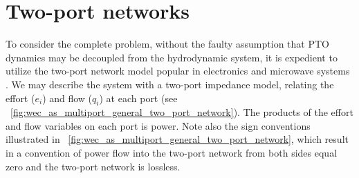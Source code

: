 \documentclass[lettersize,journal]{IEEEtran}
\newcommand{\rc}[1]{\textcolor{red}{#1}}
\begin{document}


\section{Two-port networks}\label{sec:two_port_networks}
To consider the complete problem, without the faulty assumption that PTO dynamics may be decoupled from the hydrodynamic system, it is expedient to utilize the two-port network model popular in electronics and microwave systems \cite{Marrocco:2008aa}.
We may describe the system with a two-port impedance model, relating the effort ($e_i$) and flow ($q_i$) at each port (see \figurename~\ref{fig:wec_as_multiport_general_two_port_network}).
The products of the effort and flow variables on each port is power.
Note also the sign conventions illustrated in \figurename~\ref{fig:wec_as_multiport_general_two_port_network}, which result in a convention of power flow into the two-port network from both sides equal zero and the two-port network is lossless. 
\end{document}
